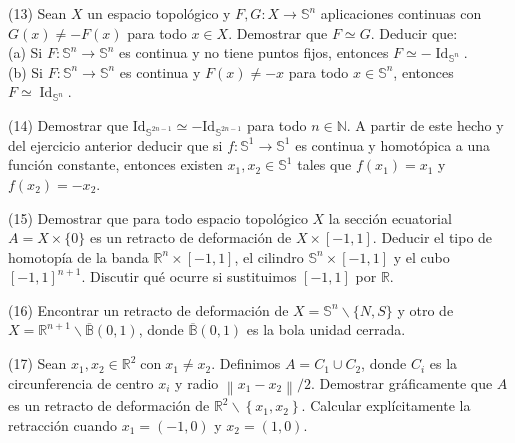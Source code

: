 \documentclass[
  a4paper,
  spanish,
  12pt,
]{scrartcl}
\begin{document}
\begin{ejer}
(13) Sean $X$ un espacio topológico y $F, G: X \rightarrow \mathbb{S}^{n}$ aplicaciones continuas con $G(x) \neq-F(x)$ para todo $x \in X$. Demostrar que $F \simeq G$. Deducir que:\\
(a) Si $F: \mathbb{S}^{n} \rightarrow \mathbb{S}^{n}$ es continua y no tiene puntos fijos, entonces $F \simeq-\operatorname{Id}_{\mathbb{S}^{n}}$.\\
(b) Si $F: \mathbb{S}^{n} \rightarrow \mathbb{S}^{n}$ es continua y $F(x) \neq-x$ para todo $x \in \mathbb{S}^{n}$, entonces $F \simeq \operatorname{Id}_{\mathbb{S}^{n}}$.\\
\end{ejer}

\begin{ejer}
(14) Demostrar que $\mathrm{Id}_{\mathbb{S}^{2 n-1}} \simeq-\mathrm{Id}_{\mathbb{S}^{2 n-1}}$ para todo $n \in \mathbb{N}$. A partir de este hecho y del ejercicio anterior deducir que si $f: \mathbb{S}^{1} \rightarrow \mathbb{S}^{1}$ es continua y homotópica a una función constante, entonces existen $x_{1}, x_{2} \in \mathbb{S}^{1}$ tales que $f\left(x_{1}\right)=x_{1}$ y $f\left(x_{2}\right)=-x_{2}$.\\
\end{ejer}

\begin{ejer}
(15) Demostrar que para todo espacio topológico $X$ la sección ecuatorial $A=X \times\{0\}$ es un retracto de deformación de $X \times[-1,1]$. Deducir el tipo de homotopía de la banda $\mathbb{R}^{n} \times[-1,1]$, el cilindro $\mathbb{S}^{n} \times[-1,1]$ y el cubo $[-1,1]^{n+1}$. Discutir qué ocurre si sustituimos $[-1,1]$ por $\mathbb{R}$.\\
\end{ejer}

\begin{ejer}
(16) Encontrar un retracto de deformación de $X=\mathbb{S}^{n} \backslash\{N, S\}$ y otro de $X=\mathbb{R}^{n+1} \backslash \overline{\mathbb{B}}(0,1)$, donde $\overline{\mathbb{B}}(0,1)$ es la bola unidad cerrada.\\
\end{ejer}

\begin{ejer}
(17) Sean $x_{1}, x_{2} \in \mathbb{R}^{2} \operatorname{con} x_{1} \neq x_{2}$. Definimos $A=C_{1} \cup C_{2}$, donde $C_{i}$ es la circunferencia de centro $x_{i}$ y radio $\left\|x_{1}-x_{2}\right\| / 2$. Demostrar gráficamente que $A$ es un retracto de deformación de $\mathbb{R}^{2} \backslash\left\{x_{1}, x_{2}\right\}$. Calcular explícitamente la retracción cuando $x_{1}=(-1,0)$ y $x_{2}=(1,0)$.\\
\end{ejer}
\end{document}
